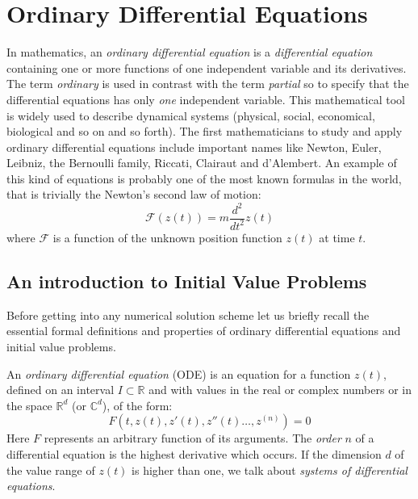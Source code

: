 %
%

\renewcommand{\arraystretch}{1.5}

\chapter{Ordinary Differential Equations}
\label{ODEs}
In mathematics, an \textit{ordinary differential equation} is a \textit{differential equation} containing one or more functions of one independent variable and its derivatives. The term \textit{ordinary} is used in contrast with the term \textit{partial} so to specify that the differential equations has only \textit{one} independent variable. This mathematical tool is widely used to describe dynamical systems (physical, social, economical, biological and so on and so forth). The first mathematicians to study and apply ordinary differential equations include important names like Newton, Euler, Leibniz, the Bernoulli family, Riccati, Clairaut and d'Alembert. An example of this kind of equations is probably one of the most known formulas in the world, that is trivially the Newton's second law of motion:
\begin{equation}
\mathcal{F}(z(t))=m\dfrac{d^2}{dt^2}z(t)
\end{equation}
where $\mathcal{F}$ is a function of the unknown position function $z(t)$ at time $t$.

\section{An introduction to Initial Value Problems}
Before getting into any numerical solution scheme let us briefly recall the essential formal definitions and properties of ordinary differential equations and initial value problems.

\begin{definition}
	An \textit{ordinary differential equation} (ODE) is an equation for a function $z(t)$, defined on an interval $I \subset \mathbb{R}$ and with values in the real or complex numbers or in the space $\mathbb{R}^d$ (or $\mathbb{C}^d$), of the form:
	\begin{equation}
		F\left(t,z(t),z'(t),z''(t)\dots,z^{(n)}\right) = 0
	\end{equation}
	Here $F$ represents an arbitrary function of its arguments. The \textit{order} $n$ of a differential equation is the highest derivative which occurs. If the dimension $d$ of the value range of $z(t)$ is higher than one, we talk about \textit{systems of differential equations}.
\end{definition}

